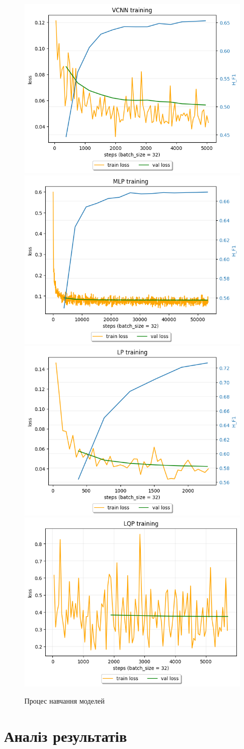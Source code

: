 \documentclass{udstu}
\begin{document}
\begin{figure}[h]
\centering
		{\includegraphics[width=0.45\linewidth]{PNG/vcnn-train}}
		{\includegraphics[width=0.45\linewidth]{PNG/mlp-train}}
		{\includegraphics[width=0.45\linewidth]{PNG/lp-train}}
		{\includegraphics[width=0.45\linewidth]{PNG/lqp-train}}
\caption{Процес навчання моделей}
\end{figure}

\chapter{Аналіз результатів}
\end{document}
